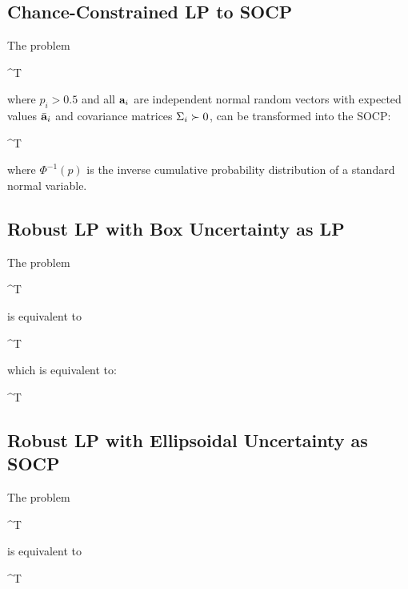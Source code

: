 \subsection{Chance-Constrained LP to SOCP}

The problem
\begin{mini!}{\vx}{\vc^T \vx}{}{}
\end{mini!}
where $p_i>0.5$ and all $\mathbf{a}_i$ are independent normal random vectors with expected values $\bar {\mathbf{a}}_i$ and covariance matrices $\Sigma_i\succ0$, can be transformed into the SOCP:
\begin{mini!}{\vx}{\vc^T \vx}{}{}
\end{mini!}
where $\Phi^{-1}(p)$ is the inverse cumulative probability distribution of a standard normal variable.

\subsection{Robust LP with Box Uncertainty as LP}

The problem
\begin{mini!}{\vx}{\vc^T \vx}{}{}
\end{mini!}
is equivalent to
\begin{mini!}{\vx}{\vc^T \vx}{}{}
\end{mini!}
which is equivalent to:
\begin{mini!}{\vx}{\vc^T \vx}{}{}
\end{mini!}

\subsection{Robust LP with Ellipsoidal Uncertainty as SOCP}

The problem
\begin{mini!}{\vx}{\vc^T \vx}{}{}
\end{mini!}
is equivalent to
\begin{mini!}{\vx}{\vc^T \vx}{}{}
\end{mini!}

